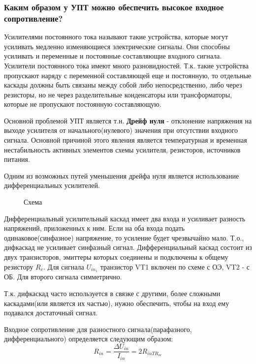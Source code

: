\subsubsection{Каким образом у УПТ можно обеспечить высокое входное сопротивление?}

Усилителями постоянного тока называют такие устройства, которые могут усиливать медленно изменяющиеся электрические сигналы. Они способны усиливать и переменные и постоянные составляющие входного сигнала. Усилители постоянного тока имеют много разновидностей. Т.к. такие устройства пропускают наряду с переменной составляющей еще и постоянную, то отдельные каскады должны быть связаны между собой либо непосредственно, либо через резисторы, но не через разделительные конденсаторы или трансформаторы, которые не пропускают постоянную составляющую.

Основной проблемой УПТ является т.н. \textbf{Дрейф нуля} - отклонение напряжения на выходе усилителя от начального(нулевого) значения при отсутствии входного сигнала. Основной причиной этого явления является температурная и временная нестабильность активных элементов схемы усилителя, резисторов, источников питания.

Одним из возможных путей уменьшения дрейфа нуля является использование дифференциальных усилителей.

\begin{center}
	\begin{figure}[h!]
		\caption{Схема}
	\end{figure}
\end{center} 

Дифференциальный усилительный каскад имеет два входа и усиливает разность напряжений, приложенных к ним. Если на оба входа подать одинаковое(синфазное) напряжение, то усиление будет чрезвычайно мало. Т.о., дифкаскад не усиливает синфазный сигнал. Дифференциальный каскад состоит из двух транзисторов, эмиттеры которых соединены и подключены к общему резистору $R_e$. Для сигнала $U_{in_1}$ транзистор VT1 включен по схеме с ОЭ, VT2 - с ОБ. Для второго сигнала симметрично.

Т.к. дифкаскад часто используется в связке с другими, более сложными каскадами(или является их частью), нужно обеспечить, чтобы на вход ему подавался достаточный сигнал.

Входное сопротивление для разностного сигнала(парафазного, дифференциального) определяется следующим образом:
$$
R_{in} = \frac{\Delta U_{in}}{I_{in}} = 2R_{inTR_{oe}}
$$

